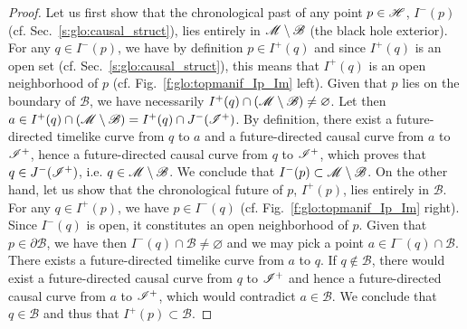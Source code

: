 
\begin{proof}
Let us first show that the chronological past of any point $p\in\mathscr{H}$, $I^-(p)$
(cf. Sec.~\ref{s:glo:causal_struct}), lies entirely in $\mathscr{M}\setminus\mathscr{B}$ (the black
hole exterior).
For any $q\in I^-(p)$, we have by definition $p\in I^+(q)$
and since $I^+(q)$ is an open set (cf. Sec.~\ref{s:glo:causal_struct}), this means that
$I^+(q)$ is an open neighborhood of $p$ (cf. Fig.~\ref{f:glo:topmanif_Ip_Im} left). Given that $p$ lies on the boundary
of $\mathscr{B}$, we have necessarily $I^+(q)\cap (\mathscr{M}\setminus\mathscr{B}) \neq \varnothing$.
Let then $a\in I^+(q)\cap (\mathscr{M}\setminus\mathscr{B}) = I^+(q)\cap J^-(\mathscr{I}^+)$.
By definition, there exist a future-directed timelike curve from $q$ to $a$ and a future-directed causal curve from $a$ to
$\mathscr{I}^+$, hence a future-directed causal curve from $q$ to $\mathscr{I}^+$, which proves that
$q\in J^-(\mathscr{I}^+)$, i.e. $q\in \mathscr{M}\setminus\mathscr{B}$. We conclude that
$I^-(p)\subset \mathscr{M}\setminus\mathscr{B}$.
On the other hand, let us show that the chronological future of $p$, $I^+(p)$,
lies entirely in $\mathscr{B}$. For any $q\in I^+(p)$,  we have $p\in I^-(q)$  (cf. Fig.~\ref{f:glo:topmanif_Ip_Im} right). Since $I^-(q)$ is open, it constitutes an open neighborhood of $p$. Given that $p\in\partial\mathscr{B}$, we have
then $I^-(q) \cap \mathscr{B} \neq \varnothing$ and we may pick a point
$a\in I^-(q) \cap \mathscr{B}$. There exists a future-directed timelike curve from $a$ to $q$.
If $q\not\in\mathscr{B}$, there would exist a future-directed causal curve from $q$ to $\mathscr{I}^+$
and hence a future-directed causal curve from $a$ to $\mathscr{I}^+$, which would contradict
$a\in\mathscr{B}$. We conclude that $q\in\mathscr{B}$ and thus that $I^+(p)\subset\mathscr{B}$.


\end{proof}
